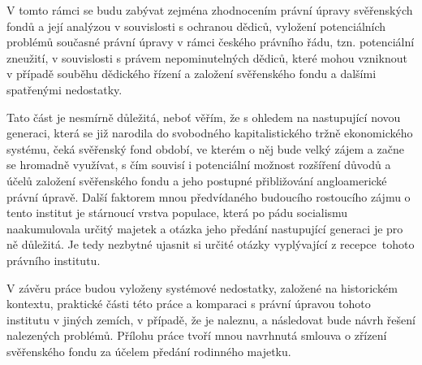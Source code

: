 \documentclass{article}
\begin{document}
\indent V tomto rámci se budu zabývat zejména zhodnocením právní úpravy svěřens\-kých fondů a její analýzou v souvislosti s ochranou dědiců, vyložení potenciálních problémů současné právní úpravy v rámci českého právního řádu, tzn. potenciální zneužití, v souvislosti s právem nepominutelných dědiců, které mohou vzniknout v případě souběhu dědického řízení a založení svěřenského fondu a dalšími spatřenými nedostatky.\\
\linebreak

\indent Tato část je nesmírně důležitá, neboť věřím, že s ohledem na nastupující novou generaci, která se již narodila do svobodného kapitalistického tržně ekonomického systému, čeká svěřenský fond období, ve kterém o něj bude velký zájem a začne se hromadně využívat, s čím souvisí i potenciální možnost rozšíření důvodů a účelů založení svěřenského fondu a jeho postupné přibližování angloamerické právní úpravě. Další faktorem mnou předvídaného budoucího rostoucího zájmu o tento institut je stárnoucí vrstva populace, která po pádu soci\-alismu naakumulovala určitý majetek a otázka jeho předání nastupující generaci je pro ně důležitá. Je tedy nezbytné ujasnit si určité otázky vyplývající z recepce\ tohoto právního institutu. \\
\linebreak

\indent V závěru práce budou vyloženy systémové nedostatky, založené na historickém kontextu, praktické části této práce a komparaci s právní úpravou tohoto institutu v jiných zemích, v případě, že je naleznu, a následovat bude návrh řešení nalezených problémů. Přílohu práce tvoří mnou navrhnutá smlouva o zřízení svěřenského fondu za účelem předání rodinného majetku.

\end{document}
